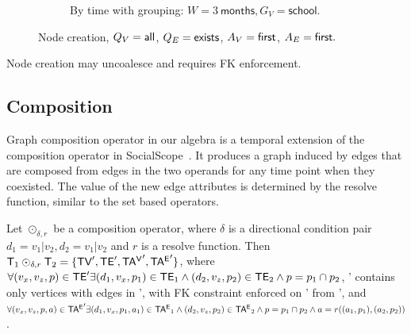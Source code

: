 \begin{figure}[t]
\begin{subfigure}[b]{0.5\textwidth}
\caption{By time with grouping: $W=3~\textsf{months}, G_V=\textsf{school}$.}
\label{fig:tg_agg4}
\end{subfigure}
\caption[]{Node creation, $Q_V=\textsf{all}$, $Q_E=\textsf{exists}$,
  $A_V=\textsf{first}$, $A_E=\textsf{first}.$}
\label{fig:tg_agg}
\vspace{-0.5cm}
\end{figure}

Node creation may uncoalesce and requires FK enforcement.


\subsection{Composition}
\label{sec:algebra:composition}


Graph composition operator in our algebra is a temporal extension of
the composition operator in SocialScope~\cite{Amer-Yahia2009}.  It
produces a graph induced by edges that are composed from edges in the
two operands for any time point when they coexisted.  The value of the
new edge attributes is determined by the resolve function, similar to
the set based operators.

\begin{definition}[Composition]
Let $\odot_{\delta,r}$ be a composition operator, where $\delta$ is a
directional condition pair $d_1=v_1|v_2, d_2=v_1|v_2$ and $r$ is a
resolve function.  Then $\mathsf{T}_1 \odot_{\delta,r} \mathsf{T}_2 = \{ \textsf{TV}',
\textsf{TE}', \mathsf{TA^{V}}', \mathsf{TA^{E}}' \}$, where $\forall (v_x,v_z,p) \in \textsf{TE}' \exists
(d_1,v_x,p_1) \in \textsf{TE}_1 \wedge (d_2,v_z,p_2) \in \textsf{TE}_2 \wedge p=p_1
\cap p_2$, \tv' contains only vertices with edges in \te', with FK
constraint enforced on \tav' from \tv', and $\forall (v_x,v_z,p,a) \in
\mathsf{TA^{E}}' \exists (d_1,v_x,p_1,a_1) \in \mathsf{TA^{E}}_1 \wedge (d_2,v_z,p_2) \in
\mathsf{TA^{E}}_2 \wedge p=p_1 \cap p_2 \wedge a=r((a_1,p_1),(a_2,p_2))$.
\label{def:composition}
\end{definition}

